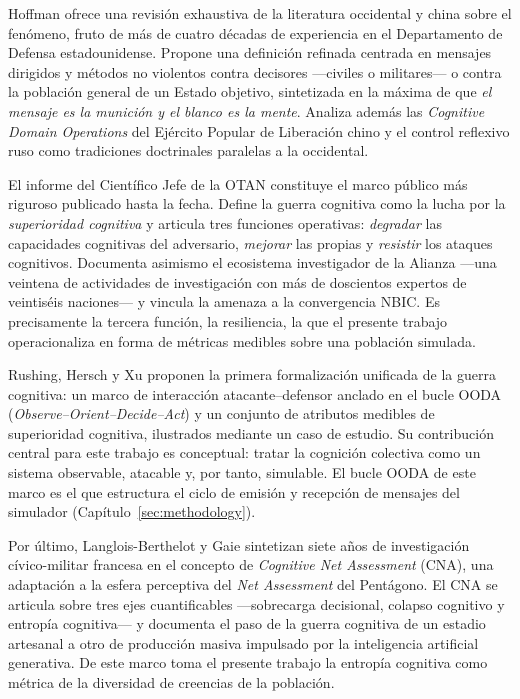 \documentclass[12pt]{extarticle}
\numberwithin{equation}{section}
\begin{document}
\begin{refsection}
Hoffman \cite{Hoffman2025} ofrece una revisi\'on exhaustiva de la literatura occidental y china sobre el fen\'omeno, fruto de m\'as de cuatro d\'ecadas de experiencia en el Departamento de Defensa estadounidense. Propone una definici\'on refinada centrada en mensajes dirigidos y m\'etodos no violentos contra decisores —civiles o militares— o contra la poblaci\'on general de un Estado objetivo, sintetizada en la m\'axima de que \emph{el mensaje es la munici\'on y el blanco es la mente}. Analiza adem\'as las \emph{Cognitive Domain Operations} del Ej\'ercito Popular de Liberaci\'on chino y el control reflexivo ruso como tradiciones doctrinales paralelas a la occidental.

El informe del Cient\'ifico Jefe de la OTAN \cite{NATOChiefScientist2025} constituye el marco p\'ublico m\'as riguroso publicado hasta la fecha. Define la guerra cognitiva como la lucha por la \emph{superioridad cognitiva} y articula tres funciones operativas: \emph{degradar} las capacidades cognitivas del adversario, \emph{mejorar} las propias y \emph{resistir} los ataques cognitivos. Documenta asimismo el ecosistema investigador de la Alianza —una veintena de actividades de investigaci\'on con m\'as de doscientos expertos de veintis\'eis naciones— y vincula la amenaza a la convergencia NBIC. Es precisamente la tercera funci\'on, la resiliencia, la que el presente trabajo operacionaliza en forma de m\'etricas medibles sobre una poblaci\'on simulada.

Rushing, Hersch y Xu \cite{RushingHerschXu2026} proponen la primera formalizaci\'on unificada de la guerra cognitiva: un marco de interacci\'on atacante--defensor anclado en el bucle OODA (\emph{Observe--Orient--Decide--Act}) y un conjunto de atributos medibles de superioridad cognitiva, ilustrados mediante un caso de estudio. Su contribuci\'on central para este trabajo es conceptual: tratar la cognici\'on colectiva como un sistema observable, atacable y, por tanto, simulable. El bucle OODA de este marco es el que estructura el ciclo de emisi\'on y recepci\'on de mensajes del simulador (Cap\'itulo~\ref{sec:methodology}).

Por \'ultimo, Langlois-Berthelot y Gaie \cite{PolytechniqueCNA2026} sintetizan siete a\~nos de investigaci\'on c\'ivico-militar francesa en el concepto de \emph{Cognitive Net Assessment} (CNA), una adaptaci\'on a la esfera perceptiva del \emph{Net Assessment} del Pent\'agono. El CNA se articula sobre tres ejes cuantificables —sobrecarga decisional, colapso cognitivo y entrop\'ia cognitiva— y documenta el paso de la guerra cognitiva de un estadio artesanal a otro de producci\'on masiva impulsado por la inteligencia artificial generativa. De este marco toma el presente trabajo la entrop\'ia cognitiva como m\'etrica de la diversidad de creencias de la poblaci\'on.


\end{refsection}
\end{document}

